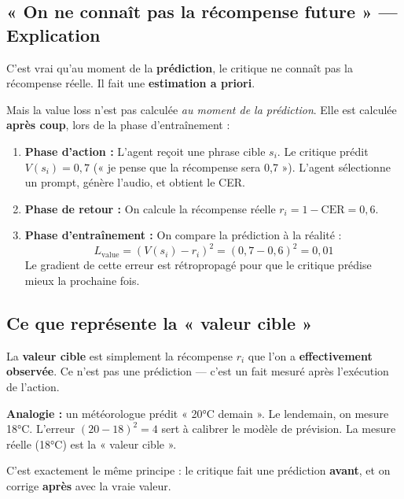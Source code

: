 \documentclass[11pt,a4paper]{article}
\begin{document}
\subsection{« On ne connaît pas la récompense future » — Explication}

C'est vrai qu'au moment de la \textbf{prédiction}, le critique ne connaît pas la récompense réelle. Il fait une \textbf{estimation a priori}.

Mais la value loss n'est pas calculée \textit{au moment de la prédiction}. Elle est calculée \textbf{après coup}, lors de la phase d'entraînement :

\begin{enumerate}
    \item \textbf{Phase d'action :} L'agent reçoit une phrase cible $s_i$. Le critique prédit $V(s_i) = 0{,}7$ (« je pense que la récompense sera 0{,}7 »). L'agent sélectionne un prompt, génère l'audio, et obtient le CER.
    
    \item \textbf{Phase de retour :} On calcule la récompense réelle $r_i = 1 - \text{CER} = 0{,}6$.
    
    \item \textbf{Phase d'entraînement :} On compare la prédiction à la réalité :
    \begin{equation}
    L_{\text{value}} = (V(s_i) - r_i)^2 = (0{,}7 - 0{,}6)^2 = 0{,}01
    \end{equation}
    Le gradient de cette erreur est rétropropagé pour que le critique prédise mieux la prochaine fois.
\end{enumerate}

\subsection{Ce que représente la « valeur cible »}

La \textbf{valeur cible} est simplement la récompense $r_i$ que l'on a \textbf{effectivement observée}. Ce n'est pas une prédiction — c'est un fait mesuré après l'exécution de l'action.

\textbf{Analogie :} un météorologue prédit « 20°C demain ». Le lendemain, on mesure 18°C. L'erreur $(20 - 18)^2 = 4$ sert à calibrer le modèle de prévision. La mesure réelle (18°C) est la « valeur cible ».

C'est exactement le même principe : le critique fait une prédiction \textbf{avant}, et on corrige \textbf{après} avec la vraie valeur.
\end{document}
